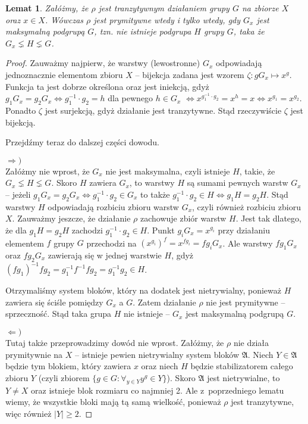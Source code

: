 \documentclass[licencjacka]{pracamgr}
\newtheorem{lemma}{Lemat}[section]
\begin{document}
\begin{lemma}\label{max_group}
    Załóżmy, że $\rho$ jest tranzytywnym działaniem grupy $G$ na zbiorze $X$ oraz $x \in X$.
    Wówczas $\rho$ jest prymitywne wtedy i tylko wtedy, gdy $G_x$ jest maksymalną podgrupą $G$, tzn.
    nie istnieje podgrupa $H$ grupy $G$, taka że $G_x \lneq H \lneq G$.
\end{lemma}
\begin{proof}
Zauważmy najpierw, że warstwy (lewostronne) $G_x$ odpowiadają
jednoznacznie elementom zbioru $X$ -- bijekcja zadana jest wzorem
$\zeta \colon g G_x \mapsto x^g$. Funkcja ta jest dobrze określona
oraz jest iniekcją, gdyż $g_1 G_x = g_2 G_x \iff g_1^{-1} \cdot g_2
= h$ dla pewnego $h \in G_x$ $\iff x^{g_1^{-1} \cdot g_2} = x^h = x
\iff x^{g_1} = x^{g_2}$. Ponadto $\zeta$ jest surjekcją, gdyż
działanie jest tranzytywne. Stąd rzeczywiście $\zeta$ jest bijekcją.

Przejdźmy teraz do dalszej części dowodu.

$\Rightarrow)$ \\
Załóżmy nie wprost, że $G_x$ nie jest maksymalna, czyli istnieje
$H$, takie, że $G_x \lneq H \lneq G$. Skoro $H$ zawiera $G_x$, to
warstwy $H$ są sumami pewnych warstw $G_x$ -- jeżeli $g_1 G_x = g_2
G_x \iff g_1^{-1} \cdot g_2 \in G_x$ to także $g_1^{-1} \cdot g_2
\in H \iff g_1 H = g_2 H$. Stąd warstwy $H$ odpowiadają rozbiciu
zbioru warstw $G_x$, czyli również rozbiciu zbioru $X$. Zauważmy
jeszcze, że działanie $\rho$ zachowuje zbiór warstw $H$. Jest tak dlatego,
że dla $g_1 H = g_2 H$ zachodzi $g_1^{-1} \cdot g_2 \in H$. Punkt
$g_i G_x = x^{g_i}$ przy działaniu elementem $f$ grupy $G$
przechodzi na $(x^{g_i})^f = x^{f g_i} = f g_i G_x$. Ale warstwy $f
g_1 G_x$ oraz $f g_2 G_x$ zawierają się w jednej warstwie $H$, gdyż
$(f g_1)^{-1} f g_2 = g_1^{-1} f^{-1} f g_2 = g_1^{-1} g_2 \in H$.

Otrzymaliśmy system bloków, który na dodatek jest
nietrywialny, ponieważ $H$ zawiera się ściśle pomiędzy $G_x$ a $G$.
Zatem działanie $\rho$ nie jest prymitywne -- sprzeczność. Stąd taka
grupa $H$ nie istnieje -- $G_x$ jest maksymalną podgrupą $G$.

$\Leftarrow)$ \\
Tutaj także przeprowadzimy dowód nie wprost. Załóżmy, że $\rho$
nie działa prymitywnie na $X$ -- istnieje pewien nietrywialny
system bloków $\mathfrak{A}$. Niech $Y \in \mathfrak{A}$ będzie tym blokiem, który
zawiera $x$ oraz niech $H$ będzie stabilizatorem całego zbioru $Y$
(czyli zbiorem $\{g \in G \colon \forall_{y \in Y} y^g \in Y \}$).
Skoro $\mathfrak{A}$ jest nietrywialne, to $Y \ne X$ oraz istnieje
blok rozmiaru co najmniej 2. Ale z~poprzedniego lematu wiemy, że
wszystkie bloki mają tą samą wielkość, ponieważ $\rho$ jest tranzytywne, więc również $|Y| \ge 2$.


\end{proof}
\end{document}
